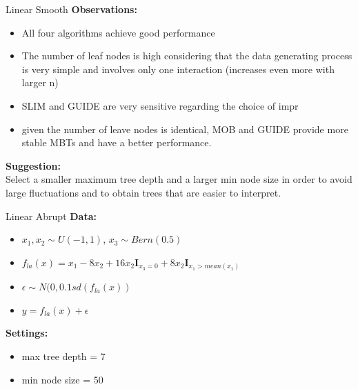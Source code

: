\documentclass[9pt, xcolor=table]{beamer}
\begin{document}
\begin{frame}{Linear Smooth}
\textbf{Observations:}
\begin{itemize}
    \item All four algorithms achieve good performance
    \item The number of leaf nodes is high considering that the data generating process is very simple and involves only one interaction (increases even more with larger n)    
    \item SLIM and GUIDE are very sensitive regarding the choice of impr
    \item  given the number of leave nodes is identical, MOB and GUIDE provide more stable MBTs and have a better performance.

\end{itemize}

\textbf{Suggestion:}\\
Select a smaller maximum tree depth and a larger min node size in order to avoid large fluctuations and to obtain trees that are easier to interpret.

    
\end{frame}




\begin{frame}{Linear Abrupt}
\textbf{Data:}
\begin{itemize}
    \item $x_1, x_2 \sim U(-1,1)$, $x_3 \sim Bern(0.5)$
    \item $ f_{la}(x) = x_{1} - 8  x_2 + 16  x_2  \mathbf{I}_{x_3 = 0} + 8  x_2  \mathbf{I}_{x_1 > mean(x_1)}$
    \item $\epsilon \sim N(0, 0.1 sd(f_{la}(x))$
    \item $y = f_{la}(x) + \epsilon$
\end{itemize} 

\textbf{Settings:}
\begin{itemize}
    \item max tree depth = 7 
    \item min node size = 50    
\end{itemize}
\end{frame}
\end{document}
